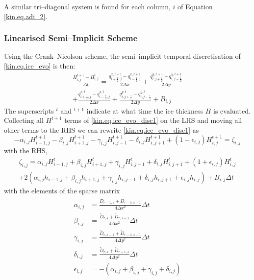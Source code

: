 A similar tri--diagonal system is found for each column, $i$ of Equation \eqref{kin.eq.adi_2}.

\subsubsection{Linearised Semi--Implicit Scheme}
Using the Crank--Nicolson scheme, the semi--implicit temporal discretisation of \eqref{kin.eq.ice_evo} is then:
\begin{multline}
\label{kin.eq.ice_evo_disc1}
  \frac{H^{t+1}_{i,j}-H^t_{i,j}}{\Delta t}=\frac{q^{x,t+1}_{i+\frac12,j}-q^{x,t+1}_{i-\frac12,j}}{2\Delta x}+\frac{q^{y,t+1}_{i,j+\frac12}-q^{y,t+1}_{i,j-\frac12}}{2\Delta y} \\
  +\frac{q^{x,t}_{i+\frac12,j}-q^{x,t}_{i-\frac12,j}}{2\Delta x}+\frac{q^{y,t}_{i,j+\frac12}-q^{y,t}_{i,j-\frac12}}{2\Delta y}+ B_{i,j}
\end{multline}
The superscripts $^t$ and $^{t+1}$ indicate at what time the ice thickness $H$ is evaluated. Collecting all $H^{t+1}$ terms of \eqref{kin.eq.ice_evo_disc1} on the LHS and moving all other terms to the RHS we can rewrite \eqref{kin.eq.ice_evo_disc1} as
\begin{equation}
  \label{kin.eq.evo_matrix}
  -\alpha_{i,j}H^{t+1}_{i-1,j} - \beta_{i,j}H^{t+1}_{i+1,j} - \gamma_{i,j}H^{t+1}_{i,j-1} - \delta_{i,j}H^{t+1}_{i,j+1}+ (1-\epsilon_{i,j})H^{t+1}_{i,j} = \zeta_{i,j}
\end{equation}
with the RHS,
\begin{multline}
  \zeta_{i,j} = \alpha_{i,j}H^{t}_{i-1,j} + \beta_{i,j}H^{t}_{i+1,j} + \gamma_{i,j}H^{t}_{i,j-1} + \delta_{i,j}H^{t}_{i,j+1} + (1+\epsilon_{i,j})H^{t}_{i,j} \\
  + 2(\alpha_{i,j}h_{i-1,j} + \beta_{i,j}h_{i+1,j} + \gamma_{i,j}h_{i,j-1} + \delta_{i,j}h_{i,j+1}+ \epsilon_{i,j}h_{i,j}) + B_{i,j}\Delta t
\end{multline}
with the elements of the sparse matrix
\begin{subequations}
  \begin{align}
    \alpha_{i,j} &=\frac{\tilde{D}_{r-1,s}+\tilde{D}_{r-1,s-1}}{4\Delta x^2}\Delta t\\
    \beta_{i,j} &=\frac{\tilde{D}_{r,s}+\tilde{D}_{r,s-1}}{4\Delta x^2}\Delta t\\
    \gamma_{i,j} &=\frac{\tilde{D}_{r,s-1}+\tilde{D}_{r-1,s-1}}{4\Delta y^2}\Delta t\\
    \delta_{i,j} &=\frac{\tilde{D}_{r,s}+\tilde{D}_{r-1,s}}{4\Delta y^2}\Delta t\\
    \epsilon_{i,j} &=-(\alpha_{i,j}+\beta_{i,j}+\gamma_{i,j}+\delta_{i,j})
  \end{align}
\end{subequations}

